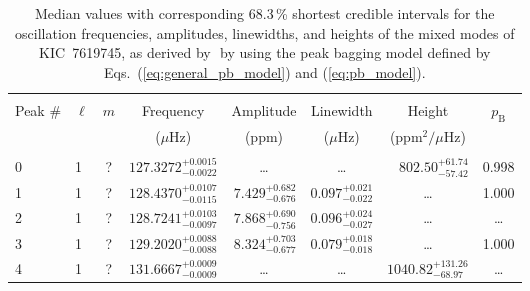 \begin{table*}[!]
\caption{Median values with corresponding 68.3\,\% shortest credible intervals for the oscillation frequencies, amplitudes, linewidths, and heights of the mixed modes of KIC~7619745, as derived by \diamonds\,\,by using the peak bagging model defined by Eqs.~(\ref{eq:general_pb_model}) and (\ref{eq:pb_model}).}
\label{tab:7619745m}
\centering
\begin{tabular}{llcrrlrc}
\hline\hline
\\[-8pt]          
Peak \# & $\ell$ & $m$ & \multicolumn{1}{c}{Frequency} & \multicolumn{1}{c}{Amplitude} & \multicolumn{1}{c}{Linewidth} & \multicolumn{1}{c}{Height}& $p_\mathrm{B}$\\
 & & & \multicolumn{1}{c}{($\mu$Hz)} & \multicolumn{1}{c}{(ppm)} & \multicolumn{1}{c}{($\mu$Hz)} & \multicolumn{1}{c}{(ppm$^2/\mu$Hz)}\\
 \hline \\[-8pt]
0 & 1 & ? & $    127.3272_{-      0.0022}^{+      0.0015}$ & \multicolumn{1}{c}{\dots} & \multicolumn{1}{c}{\dots} & $      802.50_{-       57.42}^{+       61.74}$ & 0.998\\[1pt]
1 & 1 & ? & $    128.4370_{-      0.0115}^{+      0.0107}$ & $       7.429_{-       0.676}^{+       0.682}$ & $       0.097_{-       0.022}^{+       0.021}$ & \multicolumn{1}{c}{\dots} & 1.000\\[1pt]
2 & 1 & ? & $    128.7241_{-      0.0097}^{+      0.0103}$ & $       7.868_{-       0.756}^{+       0.690}$ & $       0.096_{-       0.027}^{+       0.024}$ & \multicolumn{1}{c}{\dots} & \dots \\[1pt]
3 & 1 & ? & $    129.2020_{-      0.0088}^{+      0.0088}$ & $       8.324_{-       0.677}^{+       0.703}$ & $       0.079_{-       0.018}^{+       0.018}$ & \multicolumn{1}{c}{\dots} & 1.000\\[1pt]
4 & 1 & ? & $    131.6667_{-      0.0009}^{+      0.0009}$ & \multicolumn{1}{c}{\dots} & \multicolumn{1}{c}{\dots} & $     1040.82_{-       68.97}^{+      131.26}$ & \dots \\[1pt]


\end{tabular}
\end{table*}
